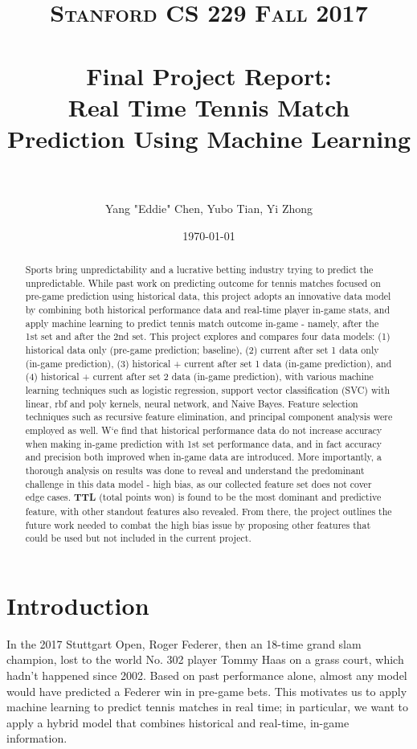 \documentclass[paper=a4, fontsize=10pt]{scrartcl} %
\title{	
\normalfont \normalsize 
\textsc{Stanford CS 229 Fall 2017} \\ [20pt] %
\horrule{0.5pt} \\[0.4cm] %
\Large Final Project Report: \\
\Large Real Time Tennis Match Prediction Using Machine Learning\\ %
\horrule{2pt} \\[0.5cm] %
}
\author{Yang "Eddie" Chen, Yubo Tian, Yi Zhong} %
\date{\normalsize\today} %
\numberwithin{equation}{section} %
\numberwithin{figure}{section} %
\numberwithin{table}{section} %
\begin{document}
\twocolumn[
\maketitle %
]
\begin{abstract}
Sports bring unpredictability and a lucrative betting industry trying to predict the unpredictable. While past work on predicting outcome for tennis matches focused on pre-game prediction using historical data, this project adopts an innovative data model by combining both historical performance data and real-time player in-game stats, and apply machine learning to predict tennis match outcome in-game - namely, after the 1st set and after the 2nd set. This project explores and compares four data models: (1) historical data only (pre-game prediction; baseline), (2) current after set 1 data only (in-game prediction), (3) historical + current after set 1 data (in-game prediction), and (4) historical + current after set 2 data (in-game prediction), with various machine learning techniques such as logistic regression, support vector classification (SVC) with linear, rbf and poly kernels, neural network, and Naive Bayes. Feature selection techniques such as recursive feature elimination, and principal component analysis were employed as well. W`e find that historical performance data do not increase accuracy when making in-game prediction with 1st set performance data, and in fact accuracy and precision both improved when in-game data are introduced. More importantly, a thorough analysis on results was done to reveal and understand the predominant challenge in this data model - high bias, as our collected feature set does not cover edge cases. \textbf{TTL} (total points won) is found to be the most dominant and predictive feature, with other standout features also revealed. From there, the project outlines the future work needed to combat the high bias issue by proposing other features that could be used but not included in the current project. 
\end{abstract}

\section{Introduction}
In the 2017 Stuttgart Open, Roger Federer, then an 18-time grand slam champion, lost to the world No. 302 player Tommy Haas on a grass court, which hadn't happened since 2002.  Based on past performance alone, almost any model would have predicted a Federer win in pre-game bets. This motivates us to apply machine learning to predict tennis matches in real time; in particular, we want to apply a hybrid model that combines historical and real-time, in-game information.
\end{document}
